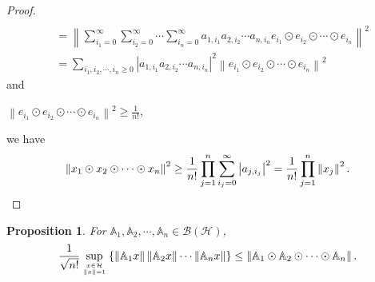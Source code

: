 \documentclass[11pt]{article}
\theoremstyle{plain}
\newtheorem{prop}[thm]{Proposition}
\theoremstyle{definition}
\begin{document}
{\begin{proof}
$$\begin{aligned}
		\\   & = \left \| \sum\limits_{i_{1}=0}^{\infty} \sum\limits_{i_{2}=0}^{\infty}\cdots \sum\limits_{i_{n}=0}^{\infty} a_{1,i_{1}} a_{2,i_{2}} \cdots a_{n,i_{n}} e_{i_{1} }\odot e_{i_{2} } \odot \cdots \odot e_{i_{n} }   \right \| ^{2}
		\\   & = \sum_{i_{1},i_{2},\cdots,i_{n} \ge 0 }\left | a_{1,i_{1} } a_{2,i_{2} }\cdots a_{n,i_{n} }\right | ^{2}\left \| e_{i_{1} }\odot e_{i_{2} } \odot \cdots \odot e_{i_{n} } \right \| ^{2}
	\end{aligned}$$
	and
	\begin{center}
		$\left \| e_{i_{1} }\odot e_{i_{2} } \odot \cdots \odot e_{i_{n} } \right \|^{2}  \ge \frac{1}{n!} $,
	\end{center}
	we have
	\begin{equation*}
			\left \| x_{1}\odot x_{2}\odot \cdots \odot x_{n}  \right \|^{2}   \ge \frac{1}{n!}\prod\limits_{j=1}^{n}  \sum\limits_{i_{j}=0}^{\infty} \left | a_{j,i_{j} }  \right | ^{2}  = \frac{1}{n!}\prod\limits_{j=1}^{n} \left \| x_{j}    \right \|^{2}. \qedhere
	\end{equation*}
\end{proof}
\begin{prop}
	For $\mathbb{A}_{1},\mathbb{A}_{2},\cdots,\mathbb{A}_{n}
	\in \mathcal{ B(H)}$,
	\begin{equation*}\label{eqsharp}
		\frac{1}{\sqrt{n!} } \sup\limits_{x\in \mathcal{H} \atop \left \| x \right \| =1} \left \{ \left \| \mathbb{A}_{1}x \right \| \left \| \mathbb{A}_{2}x \right \| \cdots \left \| \mathbb{A}_{n}x \right \|  \right \} \le\left \| \mathbb{A}_{1}\odot \mathbb{A}_{2}\odot \cdots \odot \mathbb{A}_{n}    \right \|  .
	\end{equation*}
\end{prop}

}
\end{document}
